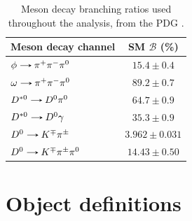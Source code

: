 \begin{table}[!ht]
    \centering
    \begin{tabular}{|l|c|}
        \hline
        \multicolumn{1}{|c|}{\cellcolor{lightgray}Meson decay channel} & \multicolumn{1}{c|}{\cellcolor{lightgray} SM $\mathcal{B}$ (\%)} \\ \hline
        $\phi\decaysto \pi^+\pi^-\pi^0$     & $15.4 \pm 0.4$   \\
        $\omega\decaysto \pi^+\pi^-\pi^0$   & $89.2 \pm 0.7$   \\
        $D^{*0}\decaysto D^{0}\pi^0$        & $64.7 \pm 0.9$   \\
        $D^{*0}\decaysto D^{0}\gamma$       & $35.3 \pm 0.9$   \\
        $D^{0}\decaysto K^{\mp}\pi^{\pm}$           & $3.962 \pm 0.031$   \\
        $D^{0}\decaysto K^{\mp}\pi^{\pm}\pi^0$      & $14.43 \pm 0.50$   \\
        \hline
    \end{tabular}
    \caption{Meson decay branching ratios used throughout the analysis, from the PDG \cite{PDG}.}
    \label{tab:Meson_decay_br}
\end{table}

\section{Object definitions}\label{sec:objects}

